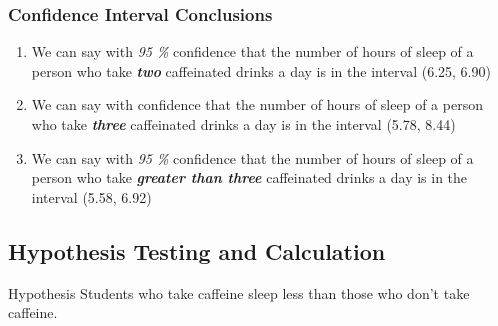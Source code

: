 \documentclass[11pt,]{beamer}
\begin{document}
\begin{frame}

    \frametitle{Confidence Interval Conclusions}

    \begin{enumerate}\addtocounter{enumi}{3}
    
        \item{We can say with \textit{95 \%} confidence that the number of hours of sleep of a person who take \emph{\textbf{two}} caffeinated drinks a day is in the interval (6.25, 6.90)} 
        
        \bigskip
        
        \item{We can say with  confidence that the number of hours of sleep of a person who take \emph{\textbf{three}} caffeinated drinks a day is in the interval (5.78, 8.44)}
        
        \bigskip
        
        \item{We can say with \textit{95 \%} confidence that the number of hours of sleep of a person who take \emph{\textbf{greater than three}} caffeinated drinks a day is in the interval (5.58, 6.92)}
        
    \end{enumerate}

\end{frame}

\subsection{Hypothesis Testing and Calculation}

\begin{frame}
    
    \begin{block}{Hypothesis}
         Students who take caffeine sleep less than those who don't take caffeine. 
    \end{block}
    
\end{frame}



    
    
    
\end{document}
